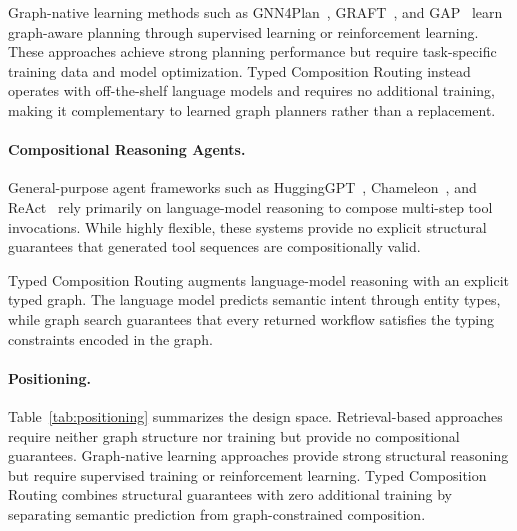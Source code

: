 Graph-native learning methods such as GNN4Plan~\cite{wang2024gnn4plan}, GRAFT~\cite{li2025graft}, and GAP~\cite{li2025gap} learn graph-aware planning through supervised learning or reinforcement learning.
These approaches achieve strong planning performance but require task-specific training data and model optimization.
Typed Composition Routing instead operates with off-the-shelf language models and requires no additional training, making it complementary to learned graph planners rather than a replacement.

\paragraph{Compositional Reasoning Agents.}

General-purpose agent frameworks such as HuggingGPT~\cite{shen2023hugginggpt}, Chameleon~\cite{lu2023chameleon}, and ReAct~\cite{yao2023react} rely primarily on language-model reasoning to compose multi-step tool invocations.
While highly flexible, these systems provide no explicit structural guarantees that generated tool sequences are compositionally valid.

Typed Composition Routing augments language-model reasoning with an explicit typed graph.
The language model predicts semantic intent through entity types, while graph search guarantees that every returned workflow satisfies the typing constraints encoded in the graph.

\paragraph{Positioning.}

Table~\ref{tab:positioning} summarizes the design space.
Retrieval-based approaches require neither graph structure nor training but provide no compositional guarantees.
Graph-native learning approaches provide strong structural reasoning but require supervised training or reinforcement learning.
Typed Composition Routing combines structural guarantees with zero additional training by separating semantic prediction from graph-constrained composition.


